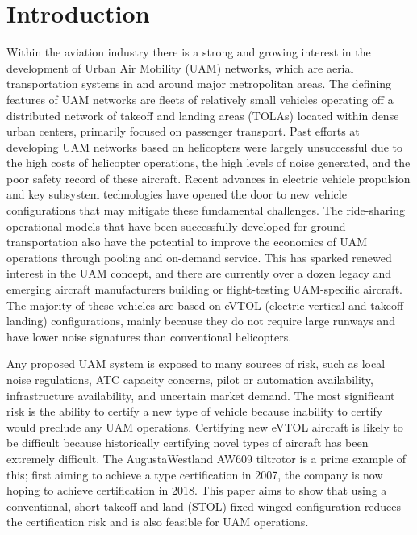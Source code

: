 \documentclass[]{aiaa-tc}%
\begin{document}
\section{Introduction}
Within the aviation industry there is a strong and growing interest in the development of Urban Air Mobility (UAM) networks,  which are aerial transportation systems in and around major metropolitan areas.  The defining features of UAM networks are fleets of relatively small vehicles operating off a distributed network of takeoff and landing areas (TOLAs) located within dense urban centers, primarily focused on passenger transport. Past efforts at developing UAM networks based on helicopters were largely unsuccessful due to the high costs of helicopter operations, the high levels of noise generated, and the poor safety record of these aircraft\cite{Vascik2017}.  Recent advances in electric vehicle propulsion and key subsystem technologies have opened the door to new vehicle configurations that may mitigate these fundamental challenges.  The ride-sharing operational models that have been successfully developed for ground transportation also have the potential to improve the economics of UAM  operations through pooling and on-demand service. This has sparked renewed interest in the UAM concept, and there are currently over a dozen legacy and emerging aircraft manufacturers building or flight-testing UAM-specific aircraft. The majority of these vehicles are based on eVTOL (electric vertical and takeoff landing) configurations, mainly because they do not require large runways and have lower noise signatures than conventional helicopters.  

Any proposed UAM system is exposed to many sources of risk, such as local noise regulations, ATC capacity concerns, pilot or automation availability, infrastructure availability, and uncertain market demand\cite{Vascik2017}\cite{Uber}.  The most significant risk is the ability to certify a new type of vehicle because inability to certify would preclude any UAM operations.  Certifying new eVTOL aircraft is likely to be difficult because historically certifying novel types of aircraft has been extremely difficult. The AugustaWestland AW609 tiltrotor is a prime example of this;  first aiming to achieve a type certification  in 2007, the company is now hoping to achieve certification in 2018\cite{AW609}.  This paper aims to show that using a conventional, short takeoff and land (STOL) fixed-winged configuration reduces the certification risk and is also feasible for UAM operations.   
\end{document}
